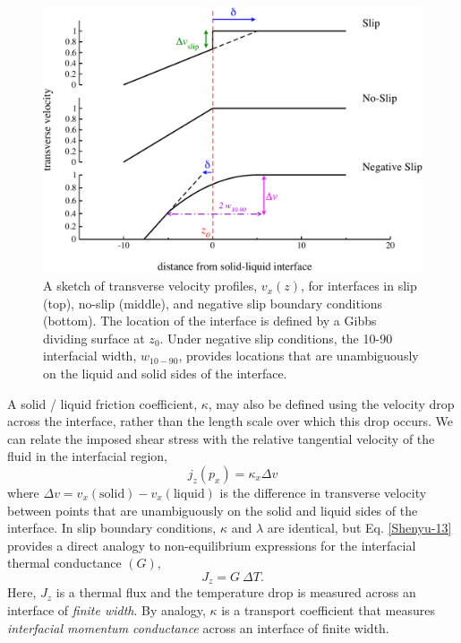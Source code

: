 \begin{figure}
\includegraphics[width=\linewidth]{Figures/slipLengthPlot}
\caption{\label{fig:slipLength} A sketch of transverse velocity
  profiles, $v_x(z)$, for interfaces in slip (top), no-slip (middle),
  and negative slip boundary conditions (bottom).  The location of the
  interface is defined by a Gibbs dividing surface at $z_0$. Under
  negative slip conditions, the 10-90 interfacial width, $w_{10-90}$,
  provides locations that are unambiguously on the liquid and solid
  sides of the interface.\label{fig:slipLengthPlot}}
\end{figure}

A solid / liquid friction coefficient, $\kappa$, may also be defined
using the velocity drop across the interface, rather than the length
scale over which this drop occurs. We can relate the imposed shear
stress with the relative tangential velocity of the fluid in the
interfacial region,\cite{Kuang2012}
\begin{equation}\label{Shenyu-13}
j_{z}(p_{x}) = \kappa_{x} \Delta v
\end{equation}
where $\Delta v = v_{x}(\mathrm{solid}) - v_{x}(\mathrm{liquid})$ is
the difference in transverse velocity between points that are
unambiguously on the solid and liquid sides of the interface.  In slip
boundary conditions, $\kappa$ and $\lambda$ are identical, but
Eq. \eqref{Shenyu-13} provides a direct analogy to non-equilibrium
expressions for the interfacial thermal conductance $(G)$,
\begin{equation}
J_z = G~ \Delta T.
\end{equation}
Here, $J_z$ is a thermal flux and the temperature drop is measured
across an interface of \textit{finite width}. By analogy, $\kappa$ is
a transport coefficient that measures \textit{interfacial momentum
  conductance} across an interface of finite width.


